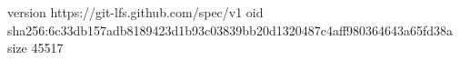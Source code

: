 version https://git-lfs.github.com/spec/v1
oid sha256:6c33db157adb8189423d1b93c03839bb20d1320487c4aff980364643a65fd38a
size 45517
